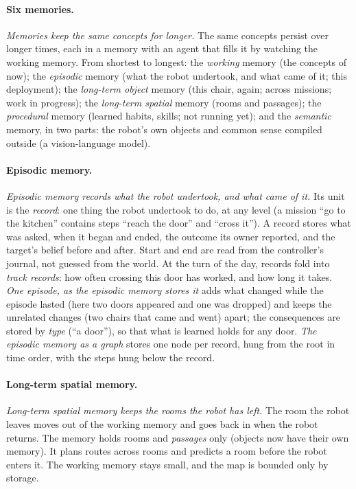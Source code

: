 \documentclass[11pt]{article}
\newcommand{\slt}[1]{\emph{#1}}   %
\begin{document}
\paragraph{Six memories.} \slt{Memories keep the same concepts for longer.} The same concepts persist over longer times, each in a memory with an agent that fills it by watching the working memory. From shortest to longest: the \emph{working} memory (the concepts of now); the \emph{episodic} memory (what the robot undertook, and what came of it; this deployment); the \emph{long-term object} memory (this chair, again; across missions; work in progress); the \emph{long-term spatial} memory (rooms and passages); the \emph{procedural} memory (learned habits, skills; not running yet); and the \emph{semantic} memory, in two parts: the robot's own objects and common sense compiled outside (a vision-language model).

\paragraph{Episodic memory.} \slt{Episodic memory records what the robot undertook, and what came of it.} Its unit is the \emph{record}: one thing the robot undertook to do, at any level (a mission ``go to the kitchen'' contains steps ``reach the door'' and ``cross it''). A record stores what was asked, when it began and ended, the outcome its owner reported, and the target's belief before and after. Start and end are read from the controller's journal, not guessed from the world. At the turn of the day, records fold into \emph{track records}: how often crossing this door has worked, and how long it takes. \slt{One episode, as the episodic memory stores it} adds what changed while the episode lasted (here two doors appeared and one was dropped) and keeps the unrelated changes (two chairs that came and went) apart; the consequences are stored by \emph{type} (``a door''), so that what is learned holds for any door. \slt{The episodic memory as a graph} stores one node per record, hung from the root in time order, with the steps hung below the record.

\paragraph{Long-term spatial memory.} \slt{Long-term spatial memory keeps the rooms the robot has left.} The room the robot leaves moves out of the working memory and goes back in when the robot returns. The memory holds rooms and \emph{passages} only (objects now have their own memory). It plans routes across rooms and predicts a room before the robot enters it. The working memory stays small, and the map is bounded only by storage.
\end{document}
